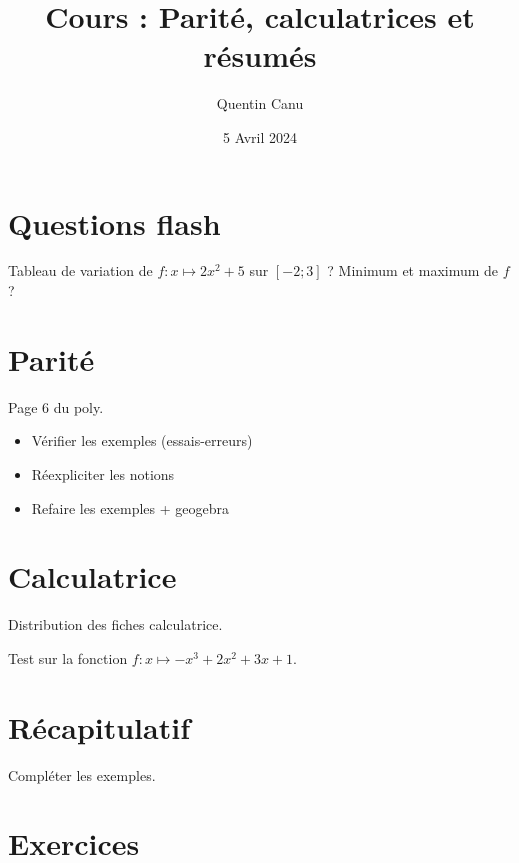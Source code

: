 \documentclass{article}
\title{Cours : Parité, calculatrices et résumés}
\author{Quentin Canu}
\date{5 Avril 2024}
\begin{document}
\maketitle

\section{Questions flash}
Tableau de variation de $f : x \mapsto 2x^2 + 5$ sur $\left[-2;3\right]$ ?
Minimum et maximum de $f$?
\section{Parité}
Page 6 du poly.
\begin{itemize}
\item Vérifier les exemples (essais-erreurs)
\item Réexpliciter les notions
\item Refaire les exemples + geogebra
\end{itemize}
\section{Calculatrice}
Distribution des fiches calculatrice.

Test sur la fonction $f : x \mapsto -x^3 + 2x^2 + 3x + 1$.
\section{Récapitulatif}
Compléter les exemples.
\section{Exercices}
\end{document}
